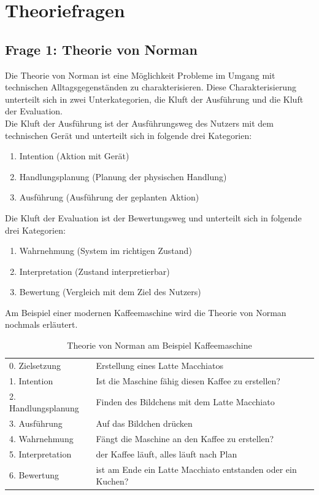 \documentclass{TUBAFarbeiten}
\begin{document}
\maketitle
\tableofcontents
\newpage
\TUBAFErklaerungsseite

\section{Theoriefragen}
\subsection{Frage 1: Theorie von Norman}
Die Theorie von Norman ist eine Möglichkeit Probleme im Umgang mit technischen Alltagsgegenständen zu charakterisieren. Diese Charakterisierung unterteilt sich in zwei Unterkategorien, die Kluft der Ausführung und die Kluft der Evaluation.\\
Die Kluft der Ausführung ist der Ausführungsweg des Nutzers mit dem technischen Gerät und unterteilt sich in folgende drei Kategorien:
\begin{enumerate}
	\item Intention (Aktion mit Gerät)
	\item Handlungsplanung (Planung der physischen Handlung)
	\item Ausführung (Ausführung der geplanten Aktion)
\end{enumerate}
Die Kluft der Evaluation ist der Bewertungsweg und unterteilt sich in folgende drei Kategorien:
\begin{enumerate}
	\item Wahrnehmung (System im richtigen Zustand)
	\item Interpretation (Zustand interpretierbar)
	\item Bewertung (Vergleich mit dem Ziel des Nutzers)
\end{enumerate}

\hfill \break
Am Beispiel einer modernen Kaffeemaschine wird die Theorie von Norman nochmals erläutert.

\begin{table}
	\centering
	\caption{Theorie von Norman am Beispiel Kaffeemaschine}
	\begin{tabular}{ll}
		0. Zielsetzung & Erstellung eines Latte Macchiatos\\
		1. Intention & Ist die Maschine fähig diesen Kaffee zu erstellen?\\
		2. Handlungsplanung & Finden des Bildchens mit dem Latte Macchiato\\
		3. Ausführung & Auf das Bildchen drücken\\
		4. Wahrnehmung & Fängt die Maschine an den Kaffee zu erstellen?\\
		5. Interpretation & der Kaffee läuft, alles läuft nach Plan\\
		6. Bewertung & ist am Ende ein Latte Macchiato entstanden oder ein Kuchen?\\
	\end{tabular}
\end{table}
\end{document}
